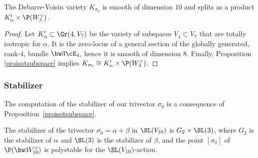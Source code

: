 \begin{coro}\label{corokalphabeta}
The Debarre-Voisin variety
$K_{\sigma_0}$ is smooth of dimension $10$ and splits as a product $K'_\alpha\times \P(W_3^\vee)$.
\end{coro}

\begin{proof} Let $K'_{\alpha}\subset \Gr(4,V_7)$ be the variety of subspaces
$V_4\subset V_7$ that are totally isotropic for $\alpha$. It is the zero-locus of a general section of the globally generated, rank\nobreakdash-$4$, bundle $\bw3\cE_4$, hence it is smooth of dimension $8$. Finally, Proposition
\ref{proisotsubspace} implies $K_{\sigma_0}\cong K'_\alpha\times \P(W_3^\vee)$.
\end{proof}

\subsubsection{Stabilizer}\label{orbetstab2}

The computation of the stabilizer of our trivector $\sigma_0$ is a consequence of Proposition~\ref{proisotsubspace}.

\begin{coro}\label{lestabgenus10}
The stabilizer of the trivector $\sigma_0 =\alpha+\beta$ in
$\SL(V_{10})$ is
$G_2\times \SL(3)$, where $G_2$ is the stabilizer of $\alpha$ and $\SL(3)$ is the stabilizer of $\beta$, and the point $[\sigma_0]$ of $\P(\bw3V_{10}^\vee)$ is polystable for the $\SL(V_{10})$-action.
\end{coro}


